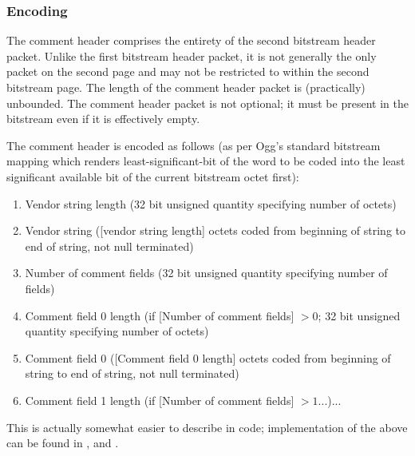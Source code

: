 \subsubsection{Encoding}

The comment header comprises the entirety of the second bitstream
header packet.  Unlike the first bitstream header packet, it is not
generally the only packet on the second page and may not be restricted
to within the second bitstream page.  The length of the comment header
packet is (practically) unbounded.  The comment header packet is not
optional; it must be present in the bitstream even if it is
effectively empty.

The comment header is encoded as follows (as per Ogg's standard
bitstream mapping which renders least-significant-bit of the word to be
coded into the least significant available bit of the current
bitstream octet first):

\begin{enumerate}
 \item
  Vendor string length (32 bit unsigned quantity specifying number of octets)

 \item
  Vendor string ([vendor string length] octets coded from beginning of string to end of string, not null terminated)

 \item
  Number of comment fields (32 bit unsigned quantity specifying number of fields)

 \item
  Comment field 0 length (if [Number of comment fields] $>0$; 32 bit unsigned quantity specifying number of octets)

 \item
  Comment field 0 ([Comment field 0 length] octets coded from beginning of string to end of string, not null terminated)

 \item
  Comment field 1 length (if [Number of comment fields] $>1$...)...

\end{enumerate}


This is actually somewhat easier to describe in code; implementation of the above can be found in ,  and .
